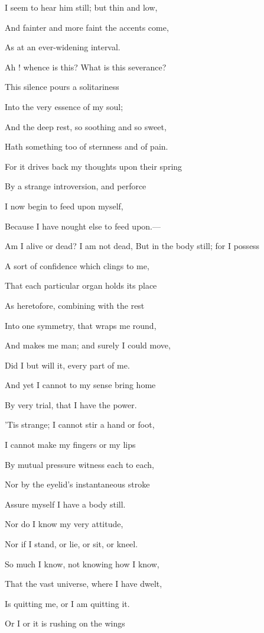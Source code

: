 I seem to hear him still; but thin and low,

And fainter and more faint the accents come,

As at an ever-widening interval.

Ah ! whence is this? What is this severance?

This silence pours a solitariness

Into the very essence of my soul;

And the deep rest, so soothing and so sweet,

Hath something too of sternness and of pain.

For it drives back my thoughts upon their spring

By a strange introversion, and perforce

I now begin to feed upon myself,

Because I have nought else to feed upon.—

Am I alive or dead? I am not dead, But in the body still; for I possess

A sort of confidence which clings to me,

That each particular organ holds its place

As heretofore, combining with the rest

Into one symmetry, that wraps me round,

And makes me man; and surely I could move,

Did I but will it, every part of me.

And yet I cannot to my sense bring home

By very trial, that I have the power.

'Tis strange; I cannot stir a hand or foot,

I cannot make my fingers or my lips

By mutual pressure witness each to each,

Nor by the eyelid's instantaneous stroke

Assure myself I have a body still.

Nor do I know my very attitude,

Nor if I stand, or lie, or sit, or kneel.

So much I know, not knowing how I know,

That the vast universe, where I have dwelt,

Is quitting me, or I am quitting it.

Or I or it is rushing on the wings


